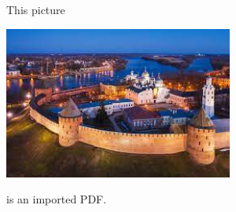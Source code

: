 \documentclass{article}
\begin{document}
This picture
\begin{center}
\includegraphics[height=5cm]{example-image}
\end{center}
is an imported PDF.
\end{document}
